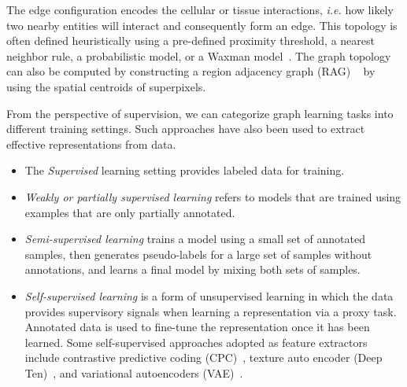 The edge configuration encodes the cellular or tissue interactions, \textit{i.e.} how likely two nearby entities will interact and consequently form an edge. 
This topology is often defined heuristically using a pre-defined proximity threshold, a nearest neighbor rule, a probabilistic model, or a Waxman model{~}.
The graph topology can also be computed by constructing a region adjacency graph (RAG) {~} by using the spatial centroids of superpixels.

From the perspective of supervision, we can categorize graph learning tasks into different training settings. Such approaches have also been used to extract effective representations from data.
\begin{itemize}
    \item The \textit{Supervised} learning setting provides labeled data for training.
    \item \textit{Weakly or partially supervised learning} refers to models that are trained using examples that are only partially annotated.
    \item \textit{Semi-supervised learning} trains a model using a small set of annotated samples, then generates pseudo-labels for a large set of samples without annotations, and learns a final model by mixing both sets of samples.
    \item \textit{Self-supervised learning} is a form of unsupervised learning in which the data provides supervisory signals when learning a representation via a proxy task. Annotated data is used to fine-tune the representation once it has been learned.
    Some self-supervised approaches adopted as feature extractors include contrastive predictive coding (CPC){~}, texture auto encoder (Deep Ten){~}, and variational autoencoders (VAE){~}.
\end{itemize}
\vspace{-6pt}

